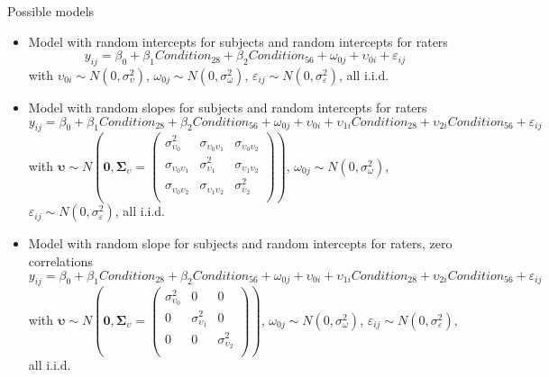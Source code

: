 \documentclass[aspectratio=169]{beamer}
\newcommand{\gvect}[1]{\boldsymbol{#1}}
\newcommand{\gmat}[1]{\boldsymbol{#1}}
\begin{document}
\begin{frame}[<+->]{Possible models}{\citep{Aungle2023}}
  \footnotesize
  \begin{itemize}
    \item Model with random intercepts for subjects and random intercepts for
      raters
  \[
    y_{ij} = \beta_0 + \beta_1 Condition_{28} + \beta_2 Condition_{56} +
      \omega_{0j} + \upsilon_{0i} + \varepsilon_{ij} 
  \]
\small
      with $\upsilon_{0i} \sim N(0, \sigma_{\upsilon}^2)$,
      $\omega_{0j} \sim N(0, \sigma_{\omega}^2)$, $\varepsilon_{ij} \sim N(0,
  \sigma_{\varepsilon}^2)$, all i.i.d. 
    \item Model with random slopes for subjects and random intercepts for
      raters
  \[
    y_{ij} = \beta_0 + \beta_1 Condition_{28} + \beta_2 Condition_{56} +
      \omega_{0j} + \upsilon_{0i} + \upsilon_{1i} Condition_{28} +
      \upsilon_{2i} Condition_{56} + \varepsilon_{ij} 
  \]
\small
with $\gvect{\upsilon} \sim N\left(\gvect{0}, \gmat{\Sigma}_{\upsilon} = 
    \begin{pmatrix}
      \sigma^2_{\upsilon_0} & \sigma_{\upsilon_0\upsilon_1}  & \sigma_{\upsilon_0\upsilon_2}\\
      \sigma_{\upsilon_0\upsilon_1} & \sigma^2_{\upsilon_1}  & \sigma_{\upsilon_1\upsilon_2}\\
      \sigma_{\upsilon_0\upsilon_2} & \sigma_{\upsilon_1\upsilon_2} & \sigma^2_{\upsilon_2} \\
    \end{pmatrix}\right)$,
      $\omega_{0j} \sim N(0, \sigma_{\omega}^2)$, $\varepsilon_{ij} \sim N(0,
  \sigma_{\varepsilon}^2)$, all i.i.d. 
    \item Model with random slope for subjects and random intercepts for
      raters, zero correlations
  \[
    y_{ij} = \beta_0 + \beta_1 Condition_{28} + \beta_2 Condition_{56} +
      \omega_{0j} + \upsilon_{0i} + \upsilon_{1i} Condition_{28} +
      \upsilon_{2i} Condition_{56} + \varepsilon_{ij} 
  \]
\small
with $\gvect{\upsilon} \sim N\left(\gvect{0}, \gmat{\Sigma}_{\upsilon} = 
    \begin{pmatrix}
      \sigma^2_{\upsilon_0} & 0  & 0\\
      0 & \sigma^2_{\upsilon_1}  & 0\\
      0 & 0 & \sigma^2_{\upsilon_2} \\
    \end{pmatrix}\right)$,
      $\omega_{0j} \sim N(0, \sigma_{\omega}^2)$, $\varepsilon_{ij} \sim N(0,
  \sigma_{\varepsilon}^2)$, all i.i.d. 
  \end{itemize}
\end{frame}
\end{document}
